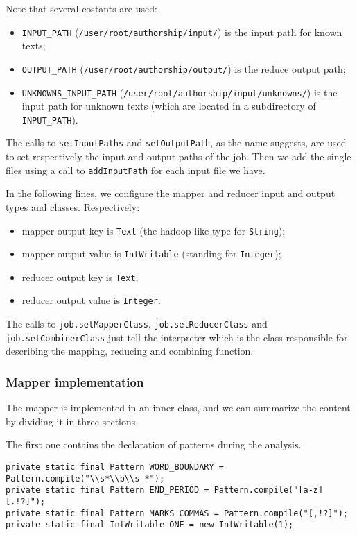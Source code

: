 \documentclass[a4paper,11pt, twoside]{article}
\begin{document}
		Note that several costants are used: \begin{itemize}
			\item \lstinline|INPUT_PATH| (\lstinline|/user/root/authorship/input/|) is the input path for known texts;
			\item \lstinline|OUTPUT_PATH| (\lstinline|/user/root/authorship/output/|) is the reduce output path;
			\item \lstinline|UNKNOWNS_INPUT_PATH| (\lstinline|/user/root/authorship/input/unknowns/|) is the input path for unknown texts (which are located in a subdirectory of \lstinline|INPUT_PATH|).
		\end{itemize}

		\noindent
		The calls to \lstinline|setInputPaths| and \lstinline|setOutputPath|, as the name suggests, are used to set respectively the input and output paths of the job. Then we add the single files using a call to \lstinline|addInputPath| for each input file we have. 
		
		\bigskip
		\noindent
		In the following lines, we configure the mapper and reducer input and output types and classes.
		Respectively: \begin{itemize}
			\item mapper output key is \lstinline|Text| (the hadoop-like type for \lstinline|String|);
			\item mapper output value is \lstinline|IntWritable| (standing for \lstinline|Integer|);
			\item reducer output key is \lstinline|Text|;
			\item reducer output value is \lstinline|Integer|.
		\end{itemize}

		\noindent
		The calls to \lstinline|job.setMapperClass|, \lstinline|job.setReducerClass| and \lstinline|job.setCombinerClass| just tell the interpreter which is the class responsible for describing the mapping, reducing and combining function.
		
	\subsubsection{Mapper implementation} 
		
		The mapper is implemented in an inner class, and we can summarize the content by dividing it in three sections.

		\noindent
		The first one contains the declaration of patterns during the analysis.
	
	\begin{lstlisting}[firstnumber=73, caption={Declaration of Regular Expression Patterns}, captionpos=b]
private static final Pattern WORD_BOUNDARY = Pattern.compile("\\s*\\b\\s *");
private static final Pattern END_PERIOD = Pattern.compile("[a-z][.!?]");
private static final Pattern MARKS_COMMAS = Pattern.compile("[,!?]");
private static final IntWritable ONE = new IntWritable(1);
	\end{lstlisting}
	
\end{document}

